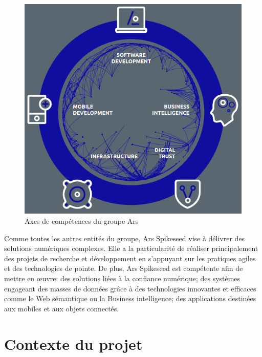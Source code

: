 \documentclass{tnreport}
\begin{document}
\begin{figure}[h]
	\centering
	\includegraphics{figures/arhs-core-services}
	\caption{Axes de compétences du groupe Ar{\texteta}s \cite{annual-report}}
	\label{fig:arhs-core-services}
\end{figure}

Comme toutes les autres entités du groupe, Ar{\texteta}s Spikeseed vise à délivrer des solutions numériques complexes. Elle a la particularité de réaliser principalement des projets de recherche et développement en s'appuyant sur les pratiques agiles et des technologies de pointe. 
De plus, Ar{\texteta}s Spikeseed est compétente afin de mettre en œuvre: 
des solutions liées à la confiance numérique; 
des systèmes engageant des masses de données grâce à des technologies innovantes et efficaces comme le Web sémantique ou la Business intelligence; 
des applications destinées aux mobiles et aux objets connectés.

\section{Contexte du projet}
\end{document}
